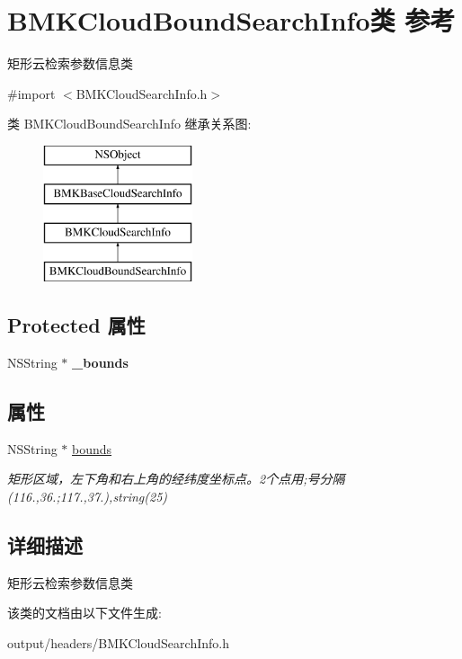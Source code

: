 \hypertarget{interface_b_m_k_cloud_bound_search_info}{}\section{B\+M\+K\+Cloud\+Bound\+Search\+Info类 参考}
\label{interface_b_m_k_cloud_bound_search_info}


矩形云检索参数信息类  




{\ttfamily \#import $<$B\+M\+K\+Cloud\+Search\+Info.\+h$>$}

类 B\+M\+K\+Cloud\+Bound\+Search\+Info 继承关系图\+:\begin{figure}[H]
\begin{center}
\leavevmode
\includegraphics[height=4.000000cm]{interface_b_m_k_cloud_bound_search_info}
\end{center}
\end{figure}
\subsection*{Protected 属性}
\begin{DoxyCompactItemize}
\item 
\hypertarget{interface_b_m_k_cloud_bound_search_info_aab508b50d538d64dbd6e45d3280aa1d9}{}N\+S\+String $\ast$ {\bfseries \+\_\+bounds}\label{interface_b_m_k_cloud_bound_search_info_aab508b50d538d64dbd6e45d3280aa1d9}

\end{DoxyCompactItemize}
\subsection*{属性}
\begin{DoxyCompactItemize}
\item 
\hypertarget{interface_b_m_k_cloud_bound_search_info_a23623d581d1b1e81766d9c46048966cb}{}N\+S\+String $\ast$ \hyperlink{interface_b_m_k_cloud_bound_search_info_a23623d581d1b1e81766d9c46048966cb}{bounds}\label{interface_b_m_k_cloud_bound_search_info_a23623d581d1b1e81766d9c46048966cb}

\begin{DoxyCompactList}\small\item\em 矩形区域，左下角和右上角的经纬度坐标点。2个点用;号分隔(116.,36.;117.,37.),string(25) \end{DoxyCompactList}\end{DoxyCompactItemize}


\subsection{详细描述}
矩形云检索参数信息类 

该类的文档由以下文件生成\+:\begin{DoxyCompactItemize}
\item 
output/headers/B\+M\+K\+Cloud\+Search\+Info.\+h\end{DoxyCompactItemize}
